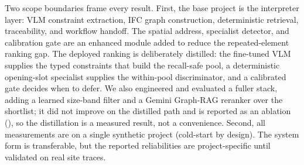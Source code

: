 Two scope boundaries frame every result. First, the base project is the interpreter layer: VLM
constraint extraction, IFC graph construction, deterministic retrieval, traceability, and workflow
handoff. The spatial address, specialist detector, and calibration gate are an enhanced module added
to reduce the repeated-element ranking gap. The deployed ranking is deliberately distilled: the
fine-tuned VLM supplies the typed constraints that build the recall-safe pool, a deterministic
opening-slot specialist supplies the within-pool discriminator, and a calibrated gate decides when to
defer. We also engineered and evaluated a fuller stack, adding a learned size-band filter and a Gemini
Graph-RAG reranker over the shortlist; it did not improve on the distilled path and is reported as an
ablation (), so the distillation is a measured result, not a convenience.
Second, all measurements are on a single synthetic project
(cold-start by design). The system form is transferable, but the reported reliabilities are
project-specific until validated on real site traces.
